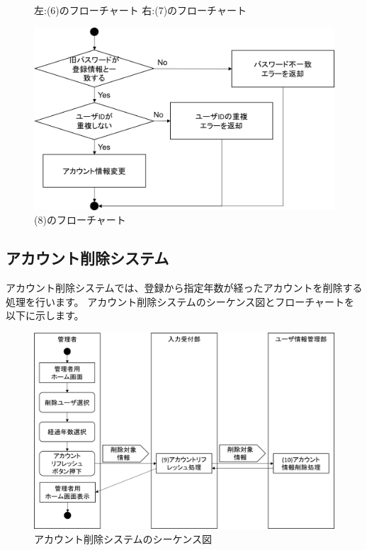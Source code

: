 \begin{figure}[htbp]
\begin{minipage}{0.5\hsize}
\begin{center}
  \end{center}
 \end{minipage}
 \caption{左:(6)のフローチャート 右:(7)のフローチャート}\label{fig:6to7}
\end{figure}

\begin{figure}[htbp]
  \begin{center}
    \includegraphics[width=0.75\linewidth,clip]{./img/flow/8.png}
    \caption{(8)のフローチャート}\label{fig:8}
  \end{center}
\end{figure}


\clearpage
\subsection{アカウント削除システム}
アカウント削除システムでは、登録から指定年数が経ったアカウントを削除する処理を行います。
アカウント削除システムのシーケンス図とフローチャートを以下に示します。

\begin{figure}[htbp]
  \begin{center}
    \includegraphics[width=1\linewidth,clip]{./img/seq4.png}
    \caption{アカウント削除システムのシーケンス図}\label{fig:seq4}
  \end{center}
\end{figure}

